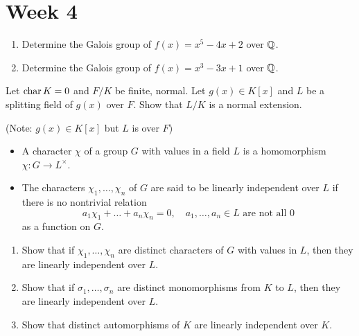 
\section{Week 4}

\begin{exercise} \mbox{}
  \begin{enumerate}
    \item Determine the Galois group of $f(x) = x^5 - 4x + 2$ over $\mathbb{Q}$.
    \item Determine the Galois group of $f(x) = x^3 - 3x + 1$ over $\mathbb{Q}$.
  \end{enumerate}
\end{exercise}

\begin{exercise}
  Let $\operatorname{char} K = 0$ and $F/K$ be finite, normal.
  Let $g(x) \in K[x]$ and $L$ be a splitting field of $g(x)$ over $F$.
  Show that $L/K$ is a normal extension.

  (Note: $g(x) \in K[x]$ but $L$ is over $F$)
\end{exercise}

\begin{exercise}
  \begin{definition} \mbox{}
    \begin{itemize}
      \item A character $\chi$ of a group $G$ with values in a field $L$
        is a homomorphism $\chi: G \to L^\times$.
      \item The characters $\chi_1, \dots, \chi_n$ of $G$ are said to be
        linearly independent over $L$ if there is no nontrivial relation
        \[
          a_1\chi_1 + \dots + a_n\chi_n = 0,
          \quad a_1, \dots, a_n \in L \text{~are not all~} 0
        \]
        as a function on $G$.
    \end{itemize}
  \end{definition}
  \begin{enumerate}
    \item Show that if $\chi_1,\dots,\chi_n$ are distinct characters of $G$ with
      values in $L$, then they are linearly independent over $L$.
    \item Show that if $\sigma_1, \dots, \sigma_n$ are distinct monomorphisms
      from $K$ to $L$, then they are linearly independent over $L$.
    \item Show that distinct automorphisms of $K$ are linearly independent over
      $K$.
  \end{enumerate}
\end{exercise}

